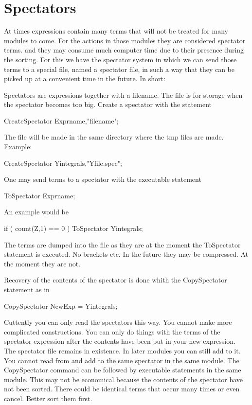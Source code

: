 
\chapter{Spectators}
\label{spectators}

At times expressions contain many terms that will not be treated for many 
modules to come. For the actions in those modules they are considered 
spectator terms. and they may consume much computer time due to their 
presence during the sorting. For this we have the spectator system in which 
we can send those terms to a special file, named a spectator file, in such 
a way that they can be picked up at a convenient time in the future. In 
short:

\noindent
Spectators are expressions together with a filename. The 
file is for storage when the spectator becomes too big. Create a spectator 
with the statement

    CreateSpectator Exprname,"filename";

\noindent
The file will be made in the same directory where the tmp files are made. 
Example:

    CreateSpectator Yintegrals,"Yfile.spec";

\noindent
One may send terms to a spectator with the executable 
statement

    ToSpectator Exprname;

\noindent
An example would be

    if ( count(Z,1) == 0 ) ToSpectator Yintegrals;

\noindent
The terms are dumped into the file as they are at the moment the 
ToSpectator statement is executed. No brackets etc.
In the future they may be compressed. At the moment they are not.

\noindent
Recovery of the contents of the spectator is done whith the CopySpectator
statement as in

    CopySpectator NewExp = Yintegrals;

\noindent
Cuttently you can only read the spectators this way. You cannot make more 
complicated constructions. You can only do things with the terms of the 
spectator expression after the contents have been put in your new 
expression. The spectator file remains in existence. In later modules you 
can still add to it. You cannot read from and add to the same spectator in 
the same module. The CopySpectator command can be followed by executable 
statements in the same module. This may not be economical because the 
contents of the spectator have not been sorted. There could be identical 
terms that occur many times or even cancel. Better sort them first.

